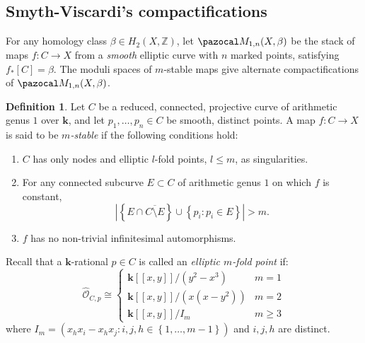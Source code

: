 \documentclass[11pt]{amsart}
\renewcommand{\k}{\mathbf k}
\renewcommand{\to}{\rightarrow}
\theoremstyle{plain}
\theoremstyle{definition}
\newtheorem{dfn}[thm]{Definition}
\begin{document}
\subsection{Smyth-Viscardi's compactifications}
For any homology class $\beta\in H_2(X,\mathbb Z)$, let $\pazocal M_{1,n}(X,\beta)$ be the stack of maps $f\colon C\to X$ from a \emph{smooth} elliptic curve with $n$ marked points, satisfying  $f_{*}\left [C\right ]=\beta$. The moduli spaces of $m$-stable maps give alternate compactifications of $\pazocal M_{1,n}(X,\beta)$.
\begin{dfn} Let $C$ be a reduced, connected, projective curve of arithmetic genus $1$ over $\k$, and let $p_1,\dots,p_n\in C$ be smooth, distinct points. A map $f\colon C\to X$ is said to be \emph{$m$-stable} if the following conditions hold:
\begin{enumerate}
 \item $C$ has only nodes and elliptic $l$-fold points, $l\leq m$, as singularities.
 \item For any connected subcurve $E\subset C$ of arithmetic genus $1$ on which $f$ is constant, 
 \[\left|\left\{E\cap \overline{C\setminus E}\right\}\cup\left\{p_i : p_i \in E\right\}\right| > m.\]
 \item $f$ has no non-trivial infinitesimal automorphisms.
 \end{enumerate}
\end{dfn}
Recall that a $\k$-rational $p\in C$ is called an \emph{elliptic $m$-fold point} if:
\[
\hat{\mathcal{O}}_{C,p}\cong
\begin{cases}
\k[[x,y]]/(y^2-x^3) &  m=1\\
\k[[x,y]]/(x(x-y^2))&  m=2\\
\k[[x,y]]/ I_m &  m\geq 3
\end{cases}
\] 
where $I_m=\left(x_hx_i-x_hx_j : i,j,h\in\left\{1,\dots,m-1\right\}\right)$ and $i,j,h$ are distinct.
\end{document}
